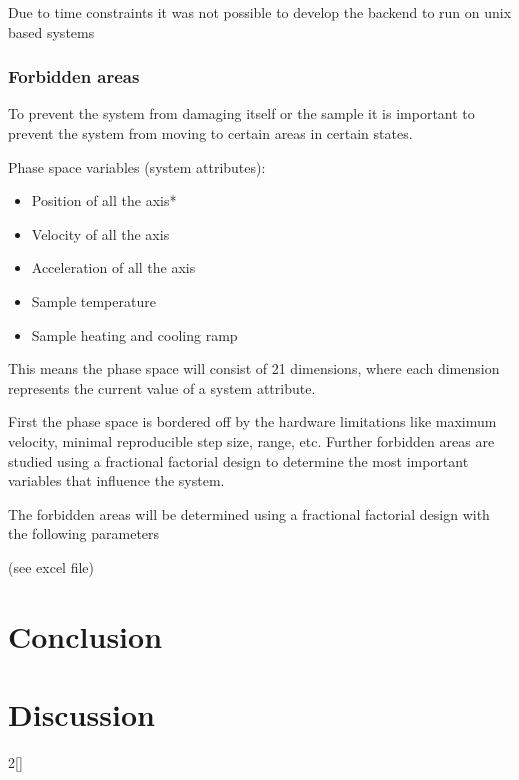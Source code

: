 \documentclass[10pt]{article}
\begin{document}
Due to time constraints it was not possible to develop the backend to run on unix based systems



\subsubsection{Forbidden areas}
To prevent the system from damaging itself or the sample it is important to prevent the system from moving to certain areas in certain states.

Phase space variables (system attributes):
\begin{itemize}
    \item Position of all the axis*
    \item Velocity of all the axis
    \item Acceleration of all the axis
    \item Sample temperature
    \item Sample heating and cooling ramp
\end{itemize}

This means the phase space will consist of 21 dimensions, where each dimension represents the current value of a system attribute.

First the phase space is bordered off by the hardware limitations like maximum velocity, minimal reproducible step size, range, etc.
Further forbidden areas are studied using a fractional factorial design to determine the most important variables that influence the system.

The forbidden areas will be determined using a fractional factorial design with the following parameters

(see excel file)




\clearpage
\section{Conclusion}

\section{Discussion}


\newpage
\begin{multicols*}
{2}[\printbibheading]
    \printbibliography[heading = none]
\end{multicols*}
\end{document}
